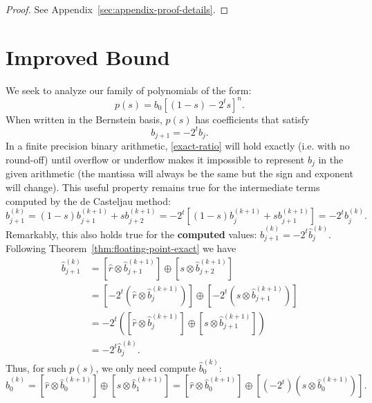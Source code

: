 \documentclass[letterpaper,10pt]{article}
\theoremstyle{definition}
\begin{document}
\begin{proof}
See Appendix~\ref{sec:appendix-proof-details}.
\end{proof}

\section{Improved Bound}\label{sec:improved-bound}

We seek to analyze our family of polynomials of the form:
\begin{equation}
p(s) = b_0 \left[(1 - s) - 2^t s\right]^n.
\end{equation}
When written in the Bernstein basis, \(p(s)\) has coefficients that satisfy
\begin{equation}\label{exact-ratio}
b_{j + 1} = -2^t b_j.
\end{equation}
In a finite precision binary arithmetic, \eqref{exact-ratio} will hold
exactly (i.e. with no round-off) until overflow or underflow makes it
impossible to represent
\(b_j\) in the given arithmetic (the mantissa will always be the same but
the sign and exponent will change). This useful property remains
true for the intermediate terms computed by the de Casteljau method:
\begin{equation}
b_{j + 1}^{(k)} = (1 - s) b_{j + 1}^{(k + 1)} + s b_{j + 2}^{(k + 1)} =
  -2^t\left[(1 - s) b_j^{(k + 1)} + s b_{j + 1}^{(k + 1)}\right] =
  -2^t b_j^{(k)}.
\end{equation}
Remarkably, this also holds true for the \textbf{computed} values:
\(\widehat{b}_{j + 1}^{(k)} =
-2^t \widehat{b}_j^{(k)}\). Following Theorem~\ref{thm:floating-point-exact}
we have
\begin{align}
\widehat{b}_{j + 1}^{(k)} &= \left[\widehat{r} \otimes
  \widehat{b}_{j + 1}^{(k + 1)}\right] \oplus
  \left[s \otimes \widehat{b}_{j + 2}^{(k + 1)}\right] \\
&= \left[-2^t \left(\widehat{r} \otimes
  \widehat{b}_j^{(k + 1)}\right)\right] \oplus
  \left[-2^t\left(s \otimes \widehat{b}_{j + 1}^{(k + 1)}\right)\right] \\
&= -2^t\left(\left[\widehat{r} \otimes
  \widehat{b}_j^{(k + 1)}\right] \oplus
  \left[s \otimes \widehat{b}_{j + 1}^{(k + 1)}\right]\right) \\
&= -2^t \widehat{b}_j^{(k)}.
\end{align}
Thus, for such \(p(s)\), we only need compute
\(\widehat{b}_0^{(k)}\):
\begin{equation}
\widehat{b}_0^{(k)} = \left[\widehat{r} \otimes
  \widehat{b}_0^{(k + 1)}\right] \oplus \left[s \otimes
  \widehat{b}_1^{(k + 1)}\right] = \left[\widehat{r} \otimes
  \widehat{b}_0^{(k + 1)}\right] \oplus \left[\left(-2^t\right) \left(s \otimes
  \widehat{b}_0^{(k + 1)}\right)\right].
\end{equation}
\end{document}

